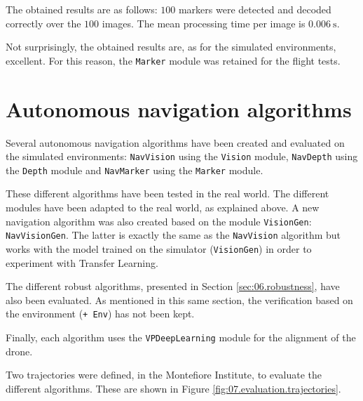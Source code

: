 The obtained results are as follows: $\num{100}$ markers were detected and decoded correctly over the $\num{100}$ images. The mean processing time per image is $\SI{0.006}{\second}$.

Not surprisingly, the obtained results are, as for the simulated environments, excellent. For this reason, the \texttt{Marker} module was retained for the flight tests.

\section{Autonomous navigation algorithms}

Several autonomous navigation algorithms have been created and evaluated on the simulated environments: \texttt{NavVision} using the \texttt{Vision} module, \texttt{NavDepth} using the \texttt{Depth} module and \texttt{NavMarker} using the \texttt{Marker} module.

These different algorithms have been tested in the real world. The different modules have been adapted to the real world, as explained above. A new navigation algorithm was also created based on the module \texttt{VisionGen}: \texttt{NavVisionGen}. The latter is exactly the same as the \texttt{NavVision} algorithm but works with the model trained on the simulator (\texttt{VisionGen}) in order to experiment with Transfer Learning.

The different robust algorithms, presented in Section \ref{sec:06.robustness}, have also been evaluated. As mentioned in this same section, the verification based on the environment (\texttt{+ Env}) has not been kept.

Finally, each algorithm uses the \texttt{VPDeepLearning} module for the alignment of the drone.

Two trajectories were defined, in the Montefiore Institute, to evaluate the different algorithms. These are shown in Figure \ref{fig:07.evaluation.trajectories}.

